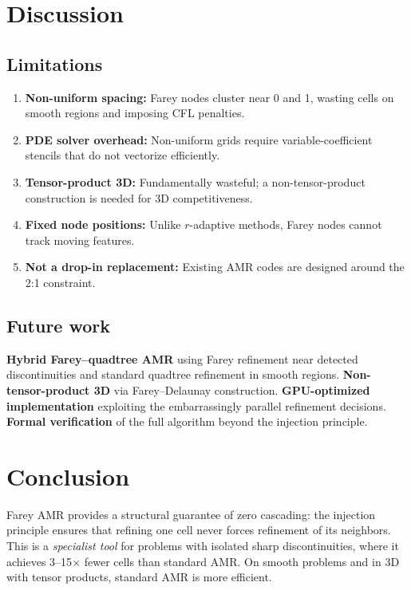 \documentclass[11pt]{article}
\theoremstyle{definition}
\begin{document}
\section{Discussion}\label{sec:discussion}

\subsection{Limitations}

\begin{enumerate}
\item \textbf{Non-uniform spacing:} Farey nodes cluster near 0 and 1,
  wasting cells on smooth regions and imposing CFL penalties.
\item \textbf{PDE solver overhead:} Non-uniform grids require
  variable-coefficient stencils that do not vectorize efficiently.
\item \textbf{Tensor-product 3D:} Fundamentally wasteful; a
  non-tensor-product construction is needed for 3D competitiveness.
\item \textbf{Fixed node positions:} Unlike $r$-adaptive methods,
  Farey nodes cannot track moving features.
\item \textbf{Not a drop-in replacement:} Existing AMR codes are
  designed around the 2:1 constraint.
\end{enumerate}

\subsection{Future work}

\textbf{Hybrid Farey--quadtree AMR} using Farey refinement near
detected discontinuities and standard quadtree refinement in smooth
regions. \textbf{Non-tensor-product 3D} via Farey--Delaunay
construction. \textbf{GPU-optimized implementation} exploiting the
embarrassingly parallel refinement decisions. \textbf{Formal
verification} of the full algorithm beyond the injection principle.


\section{Conclusion}\label{sec:conclusion}

Farey AMR provides a structural guarantee of zero cascading: the
injection principle ensures that refining one cell never forces
refinement of its neighbors. This is a \emph{specialist tool} for
problems with isolated sharp discontinuities, where it achieves
3--15$\times$ fewer cells than standard AMR. On smooth problems and
in 3D with tensor products, standard AMR is more efficient.
\end{document}
